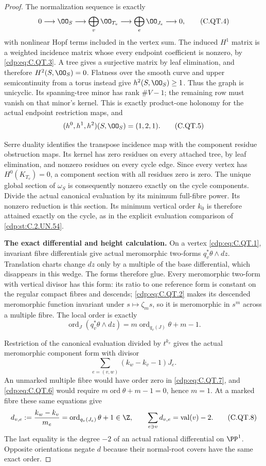 \begin{proof}
The normalization sequence is exactly
\[
 0\longrightarrow\OO_S\longrightarrow
   \bigoplus_v\OO_{T_v}\longrightarrow
   \bigoplus_e\OO_{J_e}\longrightarrow0,
\tag{C.QT.4}\label{cdp:eq:C.QT.4}
\]
with nonlinear Hopf terms included in the vertex
sum. The induced $H^1$ matrix is a weighted
incidence matrix whose every endpoint coefficient
is nonzero, by \eqref{cdp:eq:C.QT.3}. A tree gives a surjective
matrix by leaf elimination, and therefore
$H^2(S,\OO_S)=0$. Flatness over the smooth curve
and upper semicontinuity from a torus instead
give $h^2(S,\OO_S)\ge1$. Thus the graph is
unicyclic. Its spanning-tree minor has rank
$\#V-1$; the remaining row must vanish on that
minor's kernel. This is exactly product-one
holonomy for the actual endpoint restriction
maps, and
\[
                    (h^0,h^1,h^2)(S,\OO_S)=(1,2,1).
\tag{C.QT.5}\label{cdp:eq:C.QT.5}
\]

Serre duality identifies the transpose incidence
map with the component residue obstruction maps.
Its kernel has zero residues on every attached
tree, by leaf elimination, and nonzero residues
on every cycle edge. Since every vertex has
$H^0(K_{T_v})=0$, a component section with all
residues zero is zero. The unique global section
of $\omega_S$ is consequently nonzero exactly
on the cycle components. Divide the actual
canonical evaluation by its minimum full-fibre
power. Its nonzero reduction is this section.
Its minimum vertical order $k_0$ is therefore
attained exactly on the cycle, as in the explicit
evaluation comparison of \ref{cdp:st:C.2.UN.54}.

\par\medskip\noindent\textbf{The exact differential and height calculation.}
On a vertex \eqref{cdp:eq:C.QT.1}, invariant fibre differentials
give actual meromorphic two-forms
$q_v^*\theta\wedge dz$. Translation charts
change $dz$ only by a multiple of the base
differential, which disappears in this wedge.
The forms therefore glue. Every meromorphic
two-form with vertical divisor has this form:
its ratio to one reference form is constant
on the regular compact fibres and descends;
\eqref{cdp:eq:C.QT.2} makes its descended meromorphic
function invariant under $s\mapsto\zeta_ms$,
so it is meromorphic in $s^m$ across a multiple
fibre. The local order is exactly
\[
 \operatorname{ord}_{J}(q_v^*\theta\wedge dz)
             =m\operatorname{ord}_{q_v(J)}\theta+m-1.
\tag{C.QT.6}\label{cdp:eq:C.QT.6}
\]

Restriction of the canonical evaluation divided
by $t^{k_v}$ gives the actual meromorphic
component form with divisor
\[
           \sum_{e=(v,w)}(k_w-k_v-1)J_e.
\tag{C.QT.7}\label{cdp:eq:C.QT.7}
\]
An unmarked multiple fibre would have order zero
in \eqref{cdp:eq:C.QT.7}, and \eqref{cdp:eq:C.QT.6} would require
$m\operatorname{ord}\theta+m-1=0$, hence $m=1$.
At a marked fibre these same equations give
\[
 d_{v,e}:=\frac{k_w-k_v}{m_e}
       =\operatorname{ord}_{q_v(J_e)}\theta+1\in\Z,
 \qquad\sum_{e\ni v}d_{v,e}=\operatorname{val}(v)-2.
\tag{C.QT.8}\label{cdp:eq:C.QT.8}
\]
The last equality is the degree $-2$ of an
actual rational differential on $\PP^1$.
Opposite orientations negate $d$ because their
normal-root covers have the same exact order.


\end{proof}
